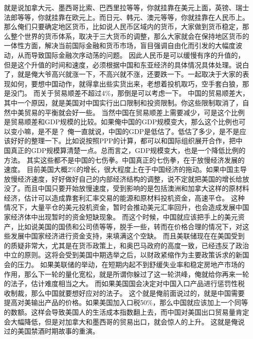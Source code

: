\documentclass[11pt]{article}
\begin{document}
就是说加拿大元、墨西哥比索、巴西里拉等等，你就挂靠在美元上面，英镑、瑞士法郎等等，你就挂靠在欧元上。而日元、韩元、澳元等等，你就挂靠在人民币上。
那么俺们只要确定地区货币，比如说人民币区域内的货币，大家做到货币稳定，那么整个世界的货币体系，取决于三大货币的调整，那么大家就会在保持地区货币的一体性方面，解决当前国际金融和货币市场，盲目强调自由化而引发的大幅度波动，从而导致国际金融次序动荡的问题。
因此人民币是可以缓慢有序的升值的，但是这个升值的时间和速度，必须根据中国和东亚经济的具体情况具体处理。说白了，就是俺大爷高兴就涨一下，不高兴就不涨，还要跌一下。一起取决于大家的表现如何，要想中国动作，就得拿出些实货出来，老想着投机取巧，空手套白狼，那是没门。
而关于贸易顺差不超过4\%，那倒是可以考虑一下。
中国的贸易顺差大，其中一个原因，就是美国对中国实行出口限制和投资限制。你这些限制取消了，自然中美贸易的平衡就会好一些。
当然中国在贸易顺差上需要减少，可是这个比例是贸易顺差和GDP规模的比较。如果俺中国的GDP规模变大，那么这个比例也可以变小嘛，是不是？
俺一直就说，中国的GDP是低估了。低估了多少，是不是应该好好的整理一下。比如说按照PPP的计算，都可以和国际组织展开合作，把中国真正的GDP规模算清楚一点。总而言之，GDP规模变大，也是一个降低比例的方法。
其实这些都不是中国的七伤拳。中国真正的七伤拳，在于放慢经济发展的速度。
目前美国大概2\%的增长，很大程度上在于中国经济的拖动。如果中国主导放慢经济速度，好好做好自己的内部经济结构的调整，说不定就把美国的增长给放没了。而且中国只要开始放慢速度，受到影响的是包括澳洲和加拿大这样的原材料经济，估计可以造成靠套利汇率交易的能源和原材料投机资金，高速平仓。
这种情况下，大量平仓的美元投机资金，暂时会推动美元汇率回升，也会造成发展中国家经济体中出现暂时的资金短缺现象。
而这个时候，中国就应该把手上的美元资产，比如说美国的国债和公司债等等，脱手一些，转而在价格合理的情况下，对这些发展中国家经济进行资金支持，来填满这个空缺。
而且美联储现在在美国受到的质疑非常大，尤其是在货币政策上，和奥巴马政府的高度一致，已经违反了政治中立的原则。这将会受到美国中期选举之后，以财政紧缩作为主要政策诉求的新国会的压力。
如果美联储的举动，在短期内起不到舒缓失业率和稳定房地产市场的作用，那么下一轮的量化宽松，就是所谓你躲过了这一轮洪峰，俺就给你再来一轮的法子，估计难度相当之大。
而如果美国国会决定对中国入口产品进行惩罚性税收制裁，那么中国就要想好应对的法子。
这个就是俺前面说过的，就是中国需要提高对美输出产品的价格。如果美国加入口税50\%，那么中国就应该加上一个同等的数额。这样会导致美国人的生活成本指数翻上去，而中国对美国出口贸易量肯定会大幅降低，但是对加拿大和墨西哥的贸易出口，就会惊人的上升。
这就是俺说过的美国禁酒时期故事的重演。
\end{document}
